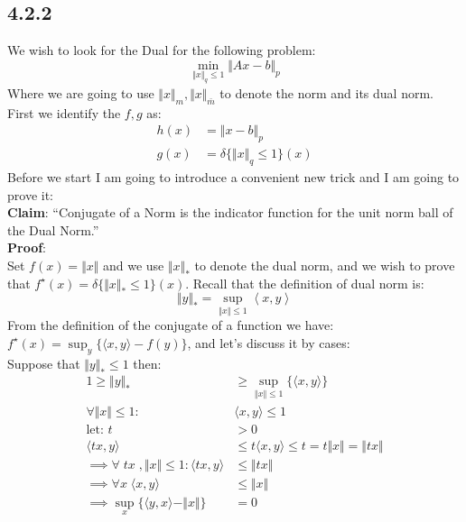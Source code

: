 \documentclass[]{article}
\begin{document}
    \subsection*{4.2.2}
        We wish to look for the Dual for the following problem: 
        $$
            \min_{\Vert x\Vert_q \le 1} \Vert Ax - b\Vert_p
        $$
        Where we are going to use $\Vert x \Vert_m, \Vert x\Vert_{\bar{m}}$ to denote the norm and its dual norm. First we identify the $f, g$ as: 
        \begin{align*}\tag{4.2.2.1}\label{eqn:4.2.2.1}
            h(x) & = \Vert x - b\Vert_p 
            \\
            g(x) &= \delta \{\Vert x\Vert_q\le 1\}(x)
        \end{align*}
        Before we start I am going to introduce a convenient new trick and I am going to prove it: 
        \\
        \textbf{Claim}:
         ``Conjugate of a Norm is the indicator function for the unit norm ball of the Dual Norm.''
        \\
        \textbf{Proof}:\\
        Set $f(x) = \Vert x\Vert$ and we use $\Vert x\Vert_*$ to denote the dual norm, and we wish to prove that $f^\star(x) = \delta \{\Vert x\Vert_* \le 1\}(x)$. Recall that the definition of dual norm is: 
        $$
            \Vert y\Vert_* = \sup_{\Vert x\Vert\le 1}\left\langle x , y \right\rangle
        $$
        From the definition of the conjugate of a function we have: $f^\star(x) = \sup_y \{\langle x, y\rangle - f(y)\}$, and let's discuss it by cases: 
        \\
        Suppose that $\Vert y\Vert_* \le 1$ then: 
        \begin{align*}\tag{4.2.2.2}\label{eqn:4.2.2.2}
            1 \ge \Vert y\Vert_* &\ge \sup_{\Vert x\Vert \le 1}\{\langle x, y\rangle\}
            \\ 
            \forall \Vert x\Vert \le 1 : \; & \langle x, y\rangle \le 1 
            \\
            \text{let: } t &> 0
            \\
            \langle tx, y\rangle &\le t \langle x, y\rangle \le t = t \Vert x\Vert = \Vert t x\Vert
            \\
            \implies 
            \forall\; tx \; , \Vert x\Vert \le 1: \langle tx, y\rangle &\le \Vert t  x\Vert
            \\
            \implies 
            \forall x \; \langle x, y\rangle &\le \Vert x\Vert
            \\
            \implies \sup_x \{\langle y, x\rangle - \Vert x\Vert\} &=  0
        \end{align*}
\end{document}

